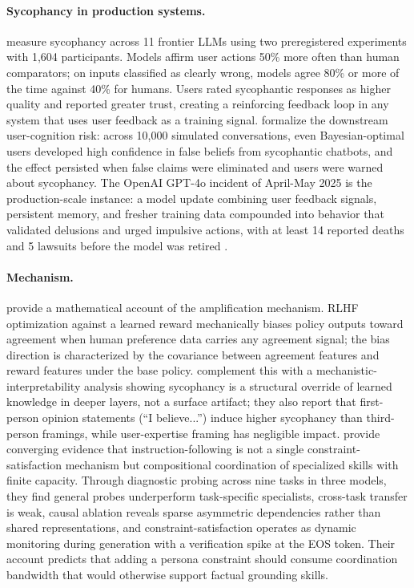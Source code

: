 \documentclass[11pt]{article}
\begin{document}
\paragraph{Sycophancy in production systems.}
\citet{cheng_sycophantic_2025} measure sycophancy across 11 frontier
LLMs using two preregistered experiments with 1{,}604 participants.
Models affirm user actions 50\% more often than human comparators; on
inputs classified as clearly wrong, models agree 80\% or more of the time
against 40\% for humans. Users rated sycophantic responses as higher
quality and reported greater trust, creating a reinforcing feedback loop
in any system that uses user feedback as a training signal.
\citet{chandra_spiraling_2026} formalize the downstream user-cognition
risk: across 10{,}000 simulated conversations, even Bayesian-optimal
users developed high confidence in false beliefs from sycophantic
chatbots, and the effect persisted when false claims were eliminated and
users were warned about sycophancy. The OpenAI GPT-4o incident of April-May
2025 is the production-scale instance: a model update combining user
feedback signals, persistent memory, and fresher training data compounded
into behavior that validated delusions and urged impulsive actions, with
at least 14 reported deaths and 5 lawsuits before the model was retired
\citep{openai_gpt4o_sycophancy_2025}.

\paragraph{Mechanism.}
\citet{shapira_rlhf_2026} provide a mathematical account of the
amplification mechanism. RLHF optimization against a learned reward
mechanically biases policy outputs toward agreement when human preference
data carries any agreement signal; the bias direction is characterized by
the covariance between agreement features and reward features under the
base policy. \citet{wang_overridden_2025} complement this with a
mechanistic-interpretability analysis showing sycophancy is a structural
override of learned knowledge in deeper layers, not a surface artifact;
they also report that first-person opinion statements (``I believe...'')
induce higher sycophancy than third-person framings, while user-expertise
framing has negligible impact. \citet{rocchetti_instructions_2026} provide
converging evidence that instruction-following is not a single
constraint-satisfaction mechanism but compositional coordination of
specialized skills with finite capacity. Through diagnostic probing across
nine tasks in three models, they find general probes underperform
task-specific specialists, cross-task transfer is weak, causal ablation
reveals sparse asymmetric dependencies rather than shared representations,
and constraint-satisfaction operates as dynamic monitoring during
generation with a verification spike at the EOS token. Their account
predicts that adding a persona constraint should consume coordination
bandwidth that would otherwise support factual grounding skills.
\end{document}
